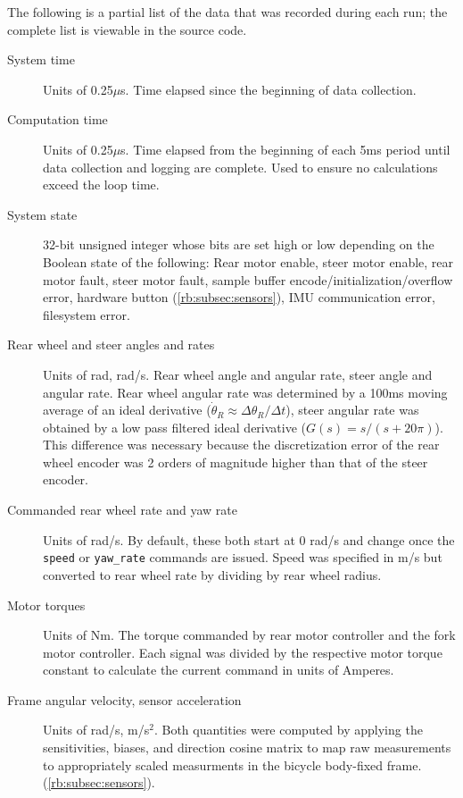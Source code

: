 The following is a partial list of the data that was recorded during each run;
the complete list is viewable in the source code.
\begin{description}
  \item[System time] Units of 0.25$\mu$s. Time elapsed since the beginning of
    data collection.
  \item[Computation time] Units of 0.25$\mu$s. Time elapsed from the
    beginning of each 5ms period until data collection and logging are
    complete. Used to ensure no calculations exceed the loop time.
  \item[System state] 32-bit unsigned integer whose bits are set high or low
    depending on the Boolean state of the following: Rear motor enable, steer
    motor enable, rear motor fault, steer motor fault, sample buffer
    encode/initialization/overflow error, hardware button
    (\autoref{rb:subsec:sensors}), IMU communication error, filesystem error.
  \item[Rear wheel and steer angles and rates] Units of rad, rad/s. Rear wheel
    angle and angular rate, steer angle and angular rate. Rear wheel angular
    rate was determined by a 100ms moving average of an ideal derivative
    ($\dot{\theta}_R \approx \Delta\theta_R / \Delta t$), steer angular rate
    was obtained by a low pass filtered ideal derivative ($G(s)=s/(s+20\pi)$).
    This difference was necessary because the discretization error of the rear
    wheel encoder was 2 orders of magnitude higher than that of the steer
    encoder.
  \item[Commanded rear wheel rate and yaw rate] Units of rad/s. By
    default, these both start at 0 rad/s and change once the \verb|speed| or
    \verb|yaw_rate| commands are issued. Speed was specified in m/s but
    converted to rear wheel rate by dividing by rear wheel radius.
  \item[Motor torques] Units of Nm. The torque commanded by rear motor
    controller and the fork motor controller. Each signal was divided by the
    respective motor torque constant to calculate the current command in units
    of Amperes.
  \item[Frame angular velocity, sensor acceleration] Units of rad/s, m/s$^2$.
    Both quantities were computed by applying the sensitivities, biases, and
    direction cosine matrix to map raw measurements to appropriately scaled
    measurments in the bicycle body-fixed frame.
    (\autoref{rb:subsec:sensors}).
\end{description}


